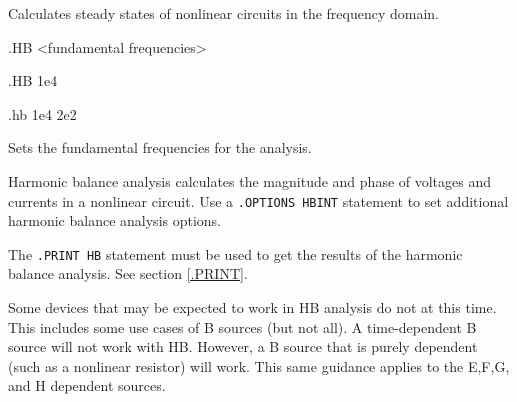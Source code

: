 


 
Calculates steady states of nonlinear circuits in the frequency domain.

\begin{Command}

\format
.HB <fundamental frequencies>

\examples
.HB 1e4

.hb 1e4 2e2
\arguments

\begin{Arguments}
Sets the fundamental frequencies for the analysis.

\end{Arguments}

\comments

Harmonic balance analysis calculates the magnitude and phase of voltages
and currents in a nonlinear circuit. Use a \texttt{.OPTIONS HBINT}
statement to set additional harmonic balance analysis options.

The \texttt{.PRINT HB}
statement must be used to get the results of the harmonic balance analysis. 
See section \ref{.PRINT}.

Some devices that may be expected to work in HB analysis do not at this time.  
  This includes some use cases of B sources (but not all).  A time-dependent B 
  source will not work with HB.  However, a B source that is purely dependent 
  (such as a nonlinear resistor) will work.    This same guidance applies to the 
  E,F,G, and H dependent sources.

\end{Command}
